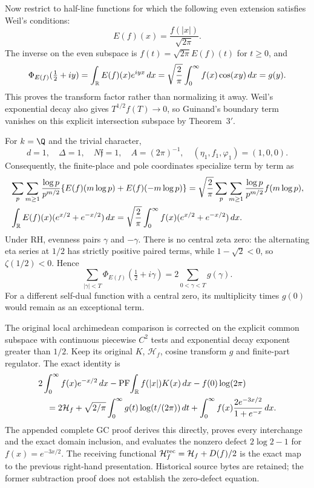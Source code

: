 Now restrict to half-line functions for which the following even extension satisfies Weil's
conditions:
\begin{equation}
 E(f)(x)=\frac{f(|x|)}{\sqrt{2\pi}}.
 \label{eq:guinand-weil-even-map}
\end{equation}
The inverse on the even subspace is $f(t)=\sqrt{2\pi}E(f)(t)$ for $t\geq0$, and
\begin{equation}
 \Phi_{E(f)}(\tfrac12+iy)
 =\int_\mathbb R E(f)(x)e^{iyx}\,dx
 =\sqrt{\frac2\pi}\int_0^\infty f(x)\cos(xy)\,dx
 =g(y).
 \label{eq:guinand-weil-transform}
\end{equation}
This proves the transform factor rather than normalizing it away.  Weil's exponential decay
also gives $T^{1/2}f(T)\to0$, so Guinand's boundary term
\cite[pp.~112--115, Thm.~3$'$]{guinand1948} vanishes on this explicit
intersection subspace by Theorem~$3'$.

For $k=\Q$ and the trivial character,
\[
 d=1,\quad\Delta=1,\quad N\mathfrak f=1,\quad A=(2\pi)^{-1},
 \quad(\eta_1,f_1,\varphi_1)=(1,0,0).
\]
Consequently, the finite-place and pole coordinates specialize term by term as
\begin{align}
 &\sum_p\sum_{m\geq1}\frac{\log p}{p^{m/2}}
 \{E(f)(m\log p)+E(f)(-m\log p)\}
 =\sqrt{\frac2\pi}\sum_p\sum_{m\geq1}
 \frac{\log p}{p^{m/2}}f(m\log p),
 \label{eq:guinand-weil-prime-map}\\
 &\int_\mathbb R E(f)(x)(e^{x/2}+e^{-x/2})\,dx
 =\sqrt{\frac2\pi}\int_0^\infty
 f(x)(e^{x/2}+e^{-x/2})\,dx.
 \label{eq:guinand-weil-pole-map}
\end{align}
Under RH, evenness pairs $\gamma$ and $-\gamma$.  There is no central zeta zero: the
alternating eta series at $1/2$ has strictly positive paired terms, while
$1-\sqrt2<0$, so $\zeta(1/2)<0$.  Hence
\begin{equation}
 \sum_{|\gamma|<T}\Phi_{E(f)}(\tfrac12+i\gamma)
 =2\sum_{0<\gamma<T}g(\gamma).
 \label{eq:guinand-weil-zero-map}
\end{equation}
For a different self-dual function with a central zero, its multiplicity times $g(0)$ would
remain as an exceptional term.

The original local archimedean comparison is corrected on the explicit
common subspace with continuous piecewise $C^2$ tests and exponential
decay exponent greater than $1/2$. Keep its original $K$, $\mathcal H_f$,
cosine transform $g$ and finite-part regulator. The exact identity is
\begin{align}
 &2\int_0^\infty f(x)e^{-x/2}\,dx
 -\operatorname{PF}\!\int_\mathbb R f(|x|)K(x)\,dx-f(0)\log(2\pi)\notag\\
 &\quad=2\mathcal H_f+\sqrt{2/\pi}\int_0^\infty g(t)\log(t/(2\pi))\,dt
 +\int_0^\infty f(x)\frac{2e^{-3x/2}}{1+e^{-x}}\,dx.
 \label{eq:guinand-weil-arch-map}
\end{align}
The appended complete GC proof derives this directly, proves every
interchange and the exact domain inclusion, and evaluates the nonzero
defect $2\log2-1$ for $f(x)=e^{-3x/2}$. The receiving functional
$\mathcal H_f^{\rm rec}=\mathcal H_f+D(f)/2$ is the exact map to the
previous right-hand presentation. Historical source bytes are retained;
the former subtraction proof does not establish the zero-defect equation.

